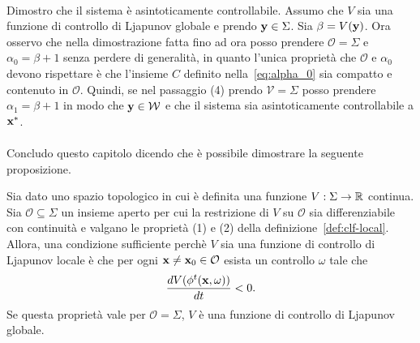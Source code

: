 \begin{steps}
    \hfill\qedsymbol\paragraph{}

    \item Dimostro che il sistema è asintoticamente controllabile.
    Assumo che $V$ sia una funzione di controllo di Ljapunov globale
    e prendo $\mathbf{y} \in \Sigma$.
    Sia $\beta = V(\mathbf{y})$.
    Ora osservo che nella dimostrazione fatta fino ad ora posso prendere
    $\mathcal O = \Sigma$ e $\alpha_0 = \beta + 1$
    senza perdere di generalità, in quanto l'unica proprietà che $\mathcal O$
    e $\alpha_0$ devono rispettare è che l'insieme $C$
    definito nella~\eqref{eq:alpha_0}
    sia compatto e contenuto in $\mathcal O$.
    Quindi, se nel passaggio (4) prendo $\mathcal V = \Sigma$
    posso prendere $\alpha_1 = \beta + 1$ in modo che
    $\mathbf{y} \in \mathcal{W}$ e che il sistema sia
    asintoticamente controllabile a $\mathbf{x}^*$.

    \hfill\qedsymbol\paragraph{}

\end{steps}

Concludo questo capitolo dicendo che è possibile
dimostrare la seguente proposizione.
\begin{prop}
    Sia dato uno spazio topologico in cui è 
    definita una funzione $V : \Sigma \to \mathbb{R}$ continua.
    Sia $\mathcal O \subseteq \Sigma$
    un insieme aperto per cui la restrizione di
    $V$ su $\mathcal O$ sia differenziabile con 
    continuità e valgano le proprietà (1) e (2) 
    della definizione~\ref{def:clf-local}.
    Allora, una condizione sufficiente perchè $V$
    sia una funzione di controllo di Ljapunov locale è che per ogni $\mathbf{x} \neq \mathbf{x}_0 \in \mathcal O$
    esista un controllo $\omega$ tale che
    \begin{equation*}
        \frac{dV(\phi^t(\mathbf{x}, \omega))}{dt} < 0.
    \end{equation*}
    Se questa proprietà vale per $\mathcal O = \Sigma$, $V$ è una funzione di controllo di Ljapunov globale. 
    \label{prop:condizione-sufficiente-ljapunov}
\end{prop}



